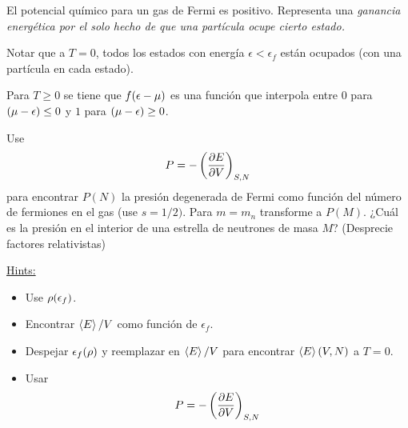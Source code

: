 El potencial químico para un gas de Fermi es positivo. Representa una \textit{ganancia energética por el solo hecho de que una partícula ocupe cierto estado.}

Notar que a $T=0$, todos los estados con energía $\epsilon<\epsilon_f$ están ocupados (con una partícula en cada estado).

Para $T\geq 0$ se tiene que $f(\epsilon-\mu )$ es una función que interpola entre $0$ para $(\mu-\epsilon)\leq 0$ y $1$ para $(\mu-\epsilon)\geq 0$.



\begin{ej}
	Use 
	\begin{equation}
  P=-\left(\pdv{E}{V}\right)_{S,N}
\end{equation}
para encontrar $P(N)$ la presión degenerada de Fermi como función del número de fermiones en el gas (use $s=1/2)$. Para $m=m_n$ transforme a $P(M)$. ¿Cuál es la presión en el interior de una estrella de neutrones de masa $M$? (Desprecie factores relativistas)

\underline{Hints:} \begin{itemize}
	\item Use $\rho (\epsilon_f)$.
	\item Encontrar $\ev{E}/V$ como función de $\epsilon_f$.
	\item Despejar $\epsilon_f(\rho )$ y reemplazar en $\ev{E}/V$ para encontrar $\ev{E}(V,N)$ a $T=0$.
	\item Usar 
	\begin{equation}
  P=-\left(\pdv{E}{V}\right)_{S,N}
\end{equation}
\end{itemize}
\end{ej}



































